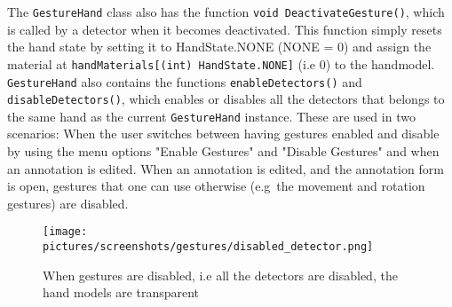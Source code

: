The \texttt{GestureHand} class also has the function \texttt{void DeactivateGesture()}, which is called by a detector when it becomes deactivated. 
This function simply resets the hand state by setting it to HandState.NONE (NONE = 0) and assign the material at \texttt{handMaterials[(int) HandState.NONE]} (i.e 0) to the
handmodel. \texttt{GestureHand} also contains the functions \texttt{enableDetectors()} and \texttt{disableDetectors()}, which 
enables or disables all the detectors that belongs to the same hand as the current \texttt{GestureHand} instance. These are used in two scenarios:
When the user switches between having gestures enabled and disable by using the menu options "Enable Gestures" and "Disable Gestures" and when an annotation 
is edited. When an annotation is edited, and the annotation form is open, gestures that one can use otherwise (e.g~the movement and rotation gestures) are disabled.

\begin{figure}%
	\texttt{[image: pictures/screenshots/gestures/disabled\_detector.png]}
	\caption[Disabled gestures]{When gestures are disabled, i.e all the detectors are disabled, the hand models are transparent}
	\label{fig:disabled_detector}
\end{figure} 